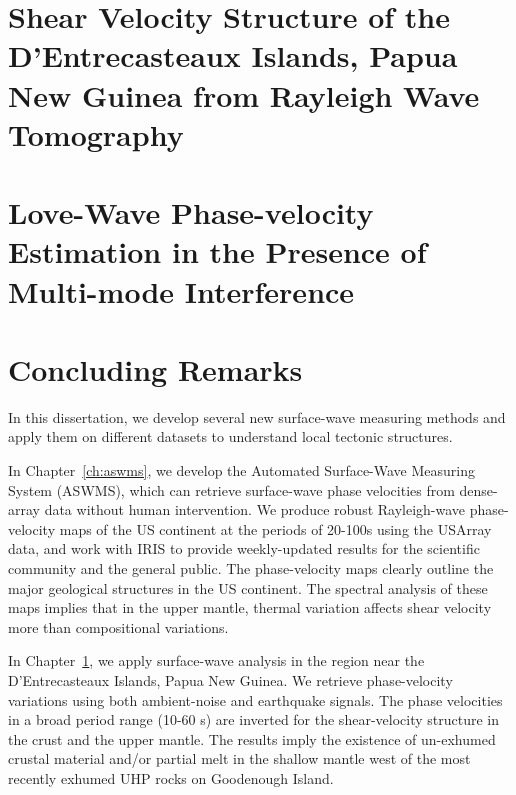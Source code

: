 \documentclass[12pt,oneside]{book}
\begin{document}

\singlespacing
\chapter[Shear velocity structure of the DI, PNG]{Shear Velocity Structure of the D'Entrecasteaux Islands, Papua New Guinea from Rayleigh Wave Tomography}
\label{ch:png}
\doublespacing

\singlespacing
\chapter[Love-wave Overtone Interference]{Love-Wave Phase-velocity Estimation in the Presence of Multi-mode Interference}
\label{ch:overtone}
\doublespacing

\singlespacing
\chapter[Conclusion]{Concluding Remarks}
\label{ch:conclusion}
\doublespacing

In this dissertation, we develop several new surface-wave measuring methods and apply them on different datasets to understand local tectonic structures.

In Chapter~\ref{ch:aswms}, we develop the Automated Surface-Wave Measuring System (ASWMS), which can retrieve surface-wave phase velocities from dense-array data without human intervention. We produce robust Rayleigh-wave phase-velocity maps of the US continent at the periods of 20-100s using the USArray data, and work with IRIS to provide weekly-updated results for the scientific community and the general public. The phase-velocity maps clearly outline the major geological structures in the US continent. The spectral analysis of these maps implies that in the upper mantle, thermal variation affects shear velocity more than compositional variations.

In Chapter~\ref{ch:png}, we apply surface-wave analysis in the region near the D'Entrecasteaux Islands, Papua New Guinea. We retrieve phase-velocity variations using both ambient-noise and earthquake signals. The phase velocities in a broad period range (10-60 s) are inverted for the shear-velocity structure in the crust and the upper mantle. The results imply the existence of un-exhumed crustal material and/or partial melt in the shallow mantle west of the most recently exhumed UHP rocks on Goodenough Island.
\end{document}
